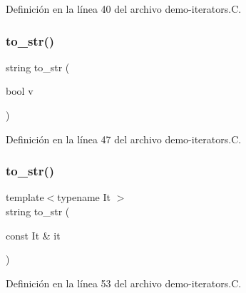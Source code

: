 Definición en la línea 40 del archivo demo-\/iterators.\+C.

\mbox{\label{demo-iterators_8_c_af423c937ed0522544ed90c34b85d897e}} 
\subsubsection{\texorpdfstring{to\+\_\+str()}{to\_str()}\hspace{0.1cm}{\footnotesize\ttfamily [1/2]}}
{\footnotesize\ttfamily string to\+\_\+str (\begin{DoxyParamCaption}\item[{bool}]{v }\end{DoxyParamCaption})}



Definición en la línea 47 del archivo demo-\/iterators.\+C.

\mbox{\label{demo-iterators_8_c_af8bbc1c2b472077a39826f8635457c12}} 
\subsubsection{\texorpdfstring{to\+\_\+str()}{to\_str()}\hspace{0.1cm}{\footnotesize\ttfamily [2/2]}}
{\footnotesize\ttfamily template$<$typename It $>$ \\
string to\+\_\+str (\begin{DoxyParamCaption}\item[{const It \&}]{it }\end{DoxyParamCaption})}



Definición en la línea 53 del archivo demo-\/iterators.\+C.

